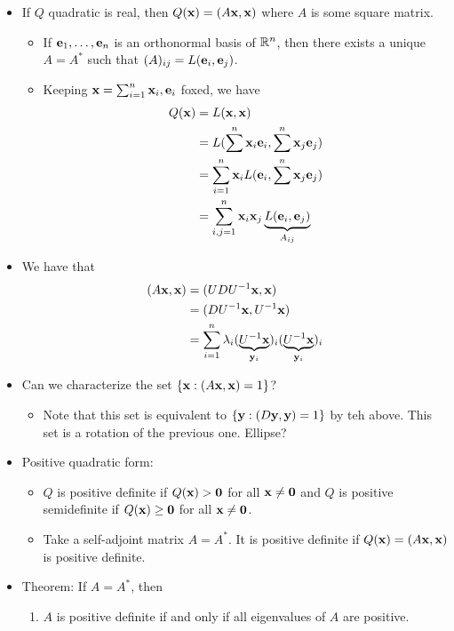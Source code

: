 \documentclass[../../notes.tex]{subfiles}
\begin{document}
\begin{itemize}
\begin{itemize}
    \end{itemize}
    \item If $Q$ quadratic is real, then $Q(\mathbf{x})=(A\mathbf{x},\mathbf{x})$ where $A$ is some square matrix.
    \begin{itemize}
        \item If $\mathbf{e}_1,\dots,\mathbf{e}_n$ is an orthonormal basis of $\mathbb{R}^n$, then there exists a unique $A=A^*$ such that $(A)_{ij}=L(\mathbf{e}_i,\mathbf{e}_j)$.
        \item Keeping $\mathbf{x}=\sum_{i=1}^n\mathbf{x}_i,\mathbf{e}_i$ foxed, we have
        \begin{align*}
            Q(\mathbf{x}) &= L(\mathbf{x},\mathbf{x})\\
            &= L(\sum^n\mathbf{x}_i\mathbf{e}_i,\sum^n\mathbf{x}_j\mathbf{e}_j)\\
            &= \sum_{i=1}^n\mathbf{x}_iL(\mathbf{e}_i,\sum^n\mathbf{x}_j\mathbf{e}_j)\\
            &= \sum_{i,j=1}^n\mathbf{x}_i\mathbf{x}_j\underbrace{L(\mathbf{e}_i,\mathbf{e}_j)}_{A_{ij}}
        \end{align*}
    \end{itemize}
    \item We have that
    \begin{align*}
        (A\mathbf{x},\mathbf{x}) &= (UDU^{-1}\mathbf{x},\mathbf{x})\\
        &= (DU^{-1}\mathbf{x},U^{-1}\mathbf{x})\\
        &= \sum_{i=1}^n\lambda_i(\underbrace{U^{-1}\mathbf{x}}_{\mathbf{y}_i})_i(\underbrace{U^{-1}\mathbf{x}}_{\mathbf{y}_i})_i
    \end{align*}
    \item Can we characterize the set $\{\mathbf{x}:(A\mathbf{x},\mathbf{x})=1\}$?
    \begin{itemize}
        \item Note that this set is equivalent to $\{\mathbf{y}:(D\mathbf{y},\mathbf{y})=1\}$ by teh above. This set is a rotation of the previous one. Ellipse?
    \end{itemize}
    \item Positive quadratic form:
    \begin{itemize}
        \item $Q$ is positive definite if $Q(\mathbf{x})>\bm{0}$ for all $\mathbf{x}\neq\bm{0}$ and $Q$ is positive semidefinite if $Q(\mathbf{x})\geq\bm{0}$ for all $\mathbf{x}\neq\bm{0}$.
        \item Take a self-adjoint matrix $A=A^*$. It is positive definite if $Q(\mathbf{x})=(A\mathbf{x},\mathbf{x})$ is positive definite.
    \end{itemize}
    \item Theorem: If $A=A^*$, then
    \begin{enumerate}
        \item $A$ is positive definite if and only if all eigenvalues of $A$ are positive.

\end{enumerate}
\end{itemize}
\end{document}

